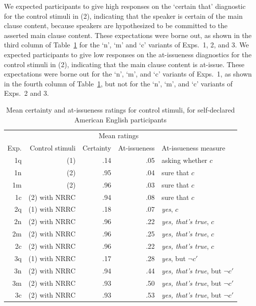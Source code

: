 \documentclass[11pt,fleqn]{article}
\newcommand{\6}{\mbox{$[\hspace*{-.6mm}[$}}
\newcommand{\9}{\mbox{$]\hspace*{-.6mm}]$}}
\begin{document}
We expected participants to give high responses on the `certain that' diagnostic for the control stimuli in (2), indicating that the speaker is certain of the main clause content, because speakers are hypothesized to be committed to the asserted main clause content. These expectations were borne out, as shown in the third column of Table~\ref{t-controls} for the `n', `m' and `c' variants of Exps.~1, 2, and 3. We expected participants to give low responses on the at-issueness diagnostics for the control stimuli in (2), indicating that the main clause content is at-issue. These expectations were borne out for the `n', `m', and `c' variants of Exps.~1, as shown in the fourth column of Table~\ref{t-controls}, but not for the `n', `m', and `c' variants of Exps.~2 and 3.

\begin{table}[h!]
\centering
\begin{tabular}{r r r r l }
& &  \multicolumn{2}{c}{Mean ratings} &  \\ 
Exp. & Control stimuli & Certainty & At-issueness & At-issueness measure \\ 
\hline
1q & (1) & .14 & .05  & asking whether $c$ \\
1n & (2) &  .95 & .04 & sure that $c$\\
1m & (2) & .96 & .03 & sure that $c$\\
1c & (2) with NRRC & .94  & .08 & sure that $c$\\
\hline
2q & (1) with NRRC & .18 & .07 & {\em yes}, $c$\\
2n & (2) with NRRC& .96 & .22 & {\em yes, that's true}, $c$\\
2m & (2) with NRRC& .96 & .25 & {\em yes, that's true}, $c$\\
2c & (2) with NRRC& .96 & .22 & {\em yes, that's true}, $c$\\
\hline
3q & (1) with NRRC & .17 &  .28 & {\em yes}, but $\neg c'$\\
3n & (2) with NRRC & .94 & .44 & {\em yes, that's true}, but $\neg c'$\\
3m & (2) with NRRC & .93 & .50 & {\em yes, that's true}, but $\neg c'$\\
3c & (2) with NRRC & .93 & .53 & {\em yes, that's true}, but $\neg c'$\\
\hline
\end{tabular}
\caption{Mean certainty and at-issueness ratings for control stimuli, for self-declared American English participants}\label{t-controls}
\end{table}
\end{document}
